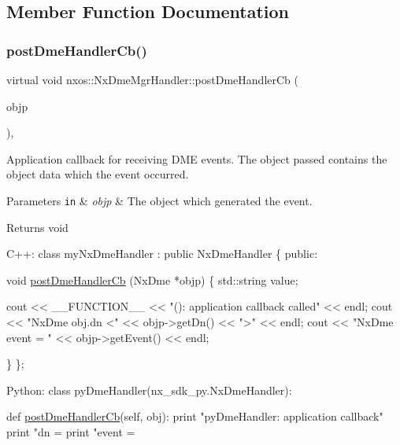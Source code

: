\subsection{Member Function Documentation}
\mbox{\label{classnxos_1_1_nx_dme_mgr_handler_a26838519d4f1d17c2036feb036a0e892}} 
\subsubsection{\texorpdfstring{post\+Dme\+Handler\+Cb()}{postDmeHandlerCb()}}
{\footnotesize\ttfamily virtual void nxos\+::\+Nx\+Dme\+Mgr\+Handler\+::post\+Dme\+Handler\+Cb (\begin{DoxyParamCaption}\item[{\mbox{\hyperlink{classnxos_1_1_nx_dme}{Nx\+Dme}} $\ast$}]{objp }\end{DoxyParamCaption})\hspace{0.3cm}{\ttfamily [inline]}, {\ttfamily [virtual]}}

Application callback for receiving D\+ME events. The object passed contains the object data which the event occurred.


\begin{DoxyParams}[1]{Parameters}
\mbox{\tt in}  & {\em objp} & The object which generated the event. \\
\hline
\end{DoxyParams}
\begin{DoxyReturn}{Returns}
void 
\begin{DoxyCode}
C++:
  \textcolor{keyword}{class }myNxDmeHandler : \textcolor{keyword}{public} NxDmeHandler \{
  \textcolor{keyword}{public}:

    \textcolor{keywordtype}{void} \mbox{\hyperlink{classnxos_1_1_nx_dme_mgr_handler_a26838519d4f1d17c2036feb036a0e892}{postDmeHandlerCb}} (NxDme *objp)
    \{
      std::string value;

      cout << \_\_FUNCTION\_\_ << \textcolor{stringliteral}{"(): application callback called"} << endl;
      cout << \textcolor{stringliteral}{"NxDme obj.dn <"} << objp->getDn() << \textcolor{stringliteral}{">"} << endl;
      cout << \textcolor{stringliteral}{"NxDme event = "} << objp->getEvent() << endl;

    \}
  \};


Python:
  \textcolor{keyword}{class }pyDmeHandler(nx\_sdk\_py.NxDmeHandler):

     def \mbox{\hyperlink{classnxos_1_1_nx_dme_mgr_handler_a26838519d4f1d17c2036feb036a0e892}{postDmeHandlerCb}}(self, obj):
         print "pyDmeHandler: application callback"
         print "dn = %
         print "event = %
\end{DoxyCode}

\end{DoxyReturn}

